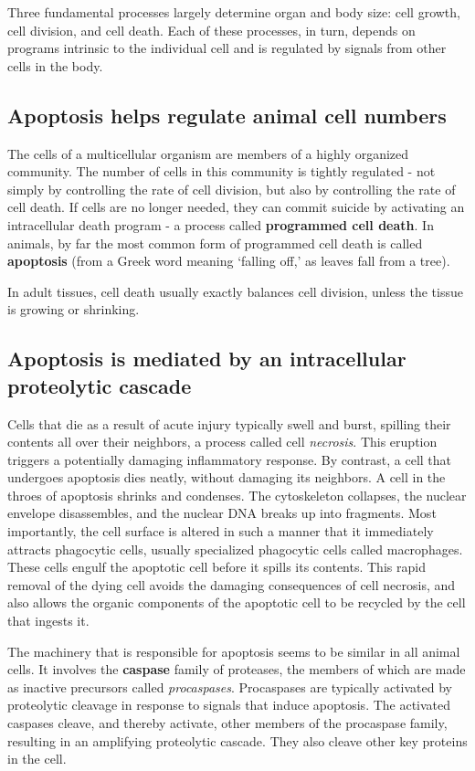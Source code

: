 Three fundamental processes largely determine organ and body size:
cell growth, cell division, and cell death. Each of these processes, in turn,
depends on programs intrinsic to the individual cell and is regulated by
signals from other cells in the body.

\subsection{Apoptosis helps regulate animal cell numbers}

The cells of a multicellular organism are members of a highly organized
community. The number of cells in this community is tightly regulated -
not simply by controlling the rate of cell division, but also by controlling
the rate of cell death. If cells are no longer needed, they can commit
suicide by activating an intracellular death program - a process called
\textbf{programmed cell death}. In animals, by far the most common form of
programmed cell death is called \textbf{apoptosis} (from a Greek word meaning
`falling off,' as leaves fall from a tree).

In adult tissues, cell death usually exactly balances cell division, unless
the tissue is growing or shrinking.

\subsection{Apoptosis is mediated by an intracellular proteolytic cascade}

Cells that die as a result of acute injury typically swell and burst, spilling
their contents all over their neighbors, a process called cell \textit{necrosis}.
This eruption triggers a potentially damaging inflammatory response.
By contrast, a cell that undergoes apoptosis dies neatly,
without damaging its neighbors. A cell in the throes of apoptosis shrinks
and condenses. The cytoskeleton collapses, the nuclear
envelope disassembles, and the nuclear DNA breaks up into fragments.
Most importantly, the cell surface is altered in such a manner
that it immediately attracts phagocytic cells, usually specialized
phagocytic cells called macrophages. These cells
engulf the apoptotic cell before it spills its contents. This
rapid removal of the dying cell avoids the damaging consequences of cell
necrosis, and also allows the organic components of the apoptotic cell to
be recycled by the cell that ingests it.

The machinery that is responsible for apoptosis seems to be similar in all
animal cells. It involves the \textbf{caspase} family of proteases, the members of
which are made as inactive precursors called \textit{procaspases}. Procaspases
are typically activated by proteolytic cleavage in response to signals that
induce apoptosis. The activated caspases cleave, and thereby activate,
other members of the procaspase family, resulting in an amplifying proteolytic
cascade. They also cleave other key proteins in the
cell.

